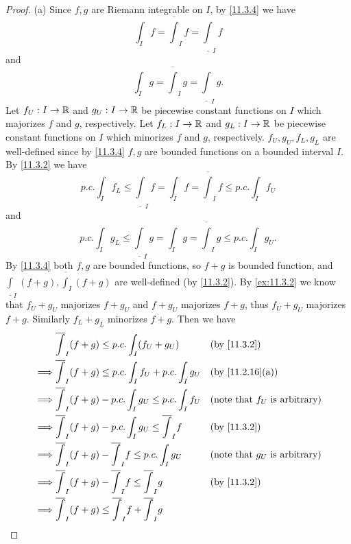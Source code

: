 \begin{proof}{(a)}
  Since \(f, g\) are Riemann integrable on \(I\), by \cref{11.3.4} we have
  \[
    \int_I f = \overline{\int}_I f = \underline{\int}_I f
  \]
  and
  \[
    \int_I g = \overline{\int}_I g = \underline{\int}_I g.
  \]
  Let \(f_U : I \to \mathbb{R}\) and \(g_U : I \to \mathbb{R}\) be piecewise constant functions on \(I\) which majorizes \(f\) and \(g\), respectively.
  Let \(f_L : I \to \mathbb{R}\) and \(g_L : I \to \mathbb{R}\) be piecewise constant functions on \(I\) which minorizes \(f\) and \(g\), respectively.
  \(f_U, g_U, f_L, g_L\) are well-defined since by \cref{11.3.4} \(f, g\) are bounded functions on a bounded interval \(I\).
  By \cref{11.3.2} we have
  \[
    p.c. \int_I f_L \leq \underline{\int}_I f = \int_I f = \overline{\int}_I f \leq p.c. \int_I f_U
  \]
  and
  \[
    p.c. \int_I g_L \leq \underline{\int}_I g = \int_I g = \overline{\int}_I g \leq p.c. \int_I g_U.
  \]
  By \cref{11.3.4} both \(f, g\) are bounded functions, so \(f + g\) is bounded function, and \(\underline{\int}_I (f + g), \overline{\int}_I (f + g)\) are well-defined (by \cref{11.3.2}).
  By \cref{ex:11.3.2} we know that \(f_U + g_U\) majorizes \(f + g_U\) and \(f + g_U\) majorizes \(f + g\), thus \(f_U + g_U\) majorizes \(f + g\).
  Similarly \(f_L + g_L\) minorizes \(f + g\).
  Then we have
  \begin{align*}
             & \overline{\int}_I (f + g) \leq p.c. \int_I (f_U + g_U)                   &   & \by{11.3.2}                             \\
    \implies & \overline{\int}_I (f + g) \leq p.c. \int_I f_U + p.c. \int_I g_U         &   & \text{(by \cref{11.2.16}(a))}           \\
    \implies & \overline{\int}_I (f + g) - p.c. \int_I g_U \leq p.c. \int_I f_U         &   & \text{(note that \(f_U\) is arbitrary)} \\
    \implies & \overline{\int}_I (f + g) - p.c. \int_I g_U \leq \overline{\int}_I f     &   & \by{11.3.2}                             \\
    \implies & \overline{\int}_I (f + g) - \overline{\int}_I f \leq p.c. \int_I g_U     &   & \text{(note that \(g_U\) is arbitrary)} \\
    \implies & \overline{\int}_I (f + g) - \overline{\int}_I f \leq \overline{\int}_I g &   & \by{11.3.2}                             \\
    \implies & \overline{\int}_I (f + g) \leq \overline{\int}_I f + \overline{\int}_I g &                                             \\

\end{align*}
\end{proof}
